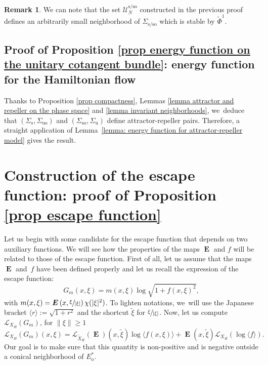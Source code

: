 \documentclass[11pt]{article}
\newcommand{\Subsection}{\subsection}
\newcommand{\ro}{\mathrm{o}}
\newcommand{\rs}{\mathrm{s}}
\newcommand{\rso}{\mathrm{so}}
\newcommand{\ru}{\mathrm{u}}
\newcommand{\ruo}{\mathrm{uo}}
\theoremstyle{definition}
\newtheorem{remark}[definition]{Remark}
\theoremstyle{plain}
\newcommand{\Lie}{\mathcal{L}}
\newcommand{\Ucal}{\mathcal{U}}
\newcommand{\w}[1]{\langle {#1} \rangle}
\DeclareMathOperator{\E}{\boldsymbol{E}}
\begin{document}
\begin{remark}
We can note that the set $\Ucal_N^{\rs/\rso}$ constructed in the previous proof defines an arbitrarily small neighborhood of $\Sigma_{\rs/\rso}$ which is stable by $\widetilde{\Phi}^1$.
\end{remark}

\Subsection{Proof of Proposition \ref{prop energy function on the unitary cotangent bundle}: energy function for the Hamiltonian flow}\label{subsection: Proof energy functions for the Hamiltonian flow}

Thanks to Proposition \ref{prop compactness}, Lemmas \ref{lemma attractor and repeller on the phase space} and \ref{lemma invariant neighborhoods}, we~deduce that $(\Sigma_{\rs},\Sigma_{\ruo})$ and $(\Sigma_{\rso},\Sigma_{\ru})$ define attractor-repeller pairs. Therefore, a straight application of Lemma~\ref{lemma: energy function for attractor-repeller model} gives the result.

\section{Construction of the escape function: proof of Proposition \ref{prop escape function}}\label{section: Proof of escape function}

Let us begin with some candidate for the escape function that depends on two auxiliary functions. We will see how the properties of the maps $\E$ and $f$ will be related to those of the escape function. First of all, let us assume that the maps~$\E$ and~$f$ have been defined properly and let us recall the expression of the escape function:
\[
G_m (x,\xi) = m(x,\xi) \log \sqrt{1 + f(x,\xi)^2},
\]
with $m(x, \xi) = \E \left(x, \sfrac{\xi}{|\xi|} \right) \chi (|\xi|^2)$. To lighten notations, we~will use the Japanese bracket $\w{r}:= \sqrt{1 + r^2}$ and the shortcut $\tilde{\xi}$ for $\sfrac{\xi}{|\xi|}$. Now, let us compute $\Lie_{X_H} (G_m)$, for $\|\xi\|\geq 1$
\[
\Lie_{X_H} \left(G_m \right) (x,\xi) = \Lie_{\widetilde{X}_H} (\E) (x, \tilde{\xi}) \log \w{f(x,\xi)} + \E (x, \tilde{\xi}) \Lie_{X_H}(\log \w{f}).
\]
Our goal is to make sure that this quantity is non-positive and is negative outside a conical neighborhood of $E_\ro^*$.
\end{document}
